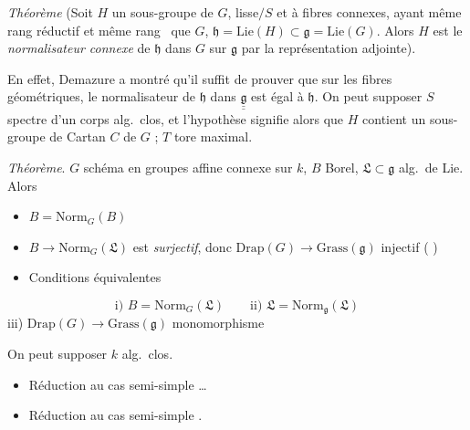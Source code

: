 \documentclass[11pt,a4paper]{article}
\begin{document}
\emph{Théorème} (Soit $H$ un sous-groupe de $G$, lisse$/S$ et à fibres
connexes, ayant même rang réductif et même rang \ que $G$,
  $\mathfrak{h} = \mathrm{Lie}(H)
\subset \mathfrak{g} = \mathrm{Lie}(G)$.  Alors $H$ est le
\emph{normalisateur connexe} de $\mathfrak{h}$ dans $G$   sur $\mathfrak{g}$ par la
représentation adjointe).

En effet, Demazure a montré qu'il suffit de prouver que sur les fibres
géométriques, le normalisateur de $\mathfrak{h}$ dans
$\underline{\underline{\mathfrak{g}}}$ est égal à $\mathfrak{h}$. On peut
supposer $S$ spectre d'un corps alg.\ clos, et \struck{\ill{}} l'hypothèse
signifie alors que $H$ contient un sous-groupe de Cartan $C$ \struck{\ill{}}
de $G$ ;  $T$  tore maximal.


\emph{Théorème}. $G$ schéma en groupes affine connexe sur $k$,
$B$ Borel, $\mathfrak{L} \subset \mathfrak{g}$ alg.\ de Lie. Alors
\begin{itemize}
  \item[a)] $B = \mathrm{Norm}_G(B)$
  \item[b)] $B \to \mathrm{Norm}_G(\mathfrak{L})$ est \emph{surjectif},
  donc $\mathrm{Drap}(G) \to \mathrm{Grass}(\mathfrak{g})$
  injectif ( \ill{} \ill{} \ill{})
  \item[c)] Conditions équivalentes
\end{itemize}
\[
\text{i) } B = \mathrm{Norm}_G(\mathfrak{L}) \qquad
\text{ii) } \mathfrak{L} = \mathrm{Norm}_{\mathfrak{g}}(\mathfrak{L})
\]
iii) $\mathrm{Drap}(G) \to \mathrm{Grass}(\mathfrak{g})$
monomorphisme

On peut supposer $k$ alg.\ clos.
\begin{itemize}
  \item[a)] Réduction au cas semi-simple \ldots
  \item[b)]  Réduction au cas semi-simple
  \struck{\ill{}} \ill{}.
\end{itemize}
\end{document}
